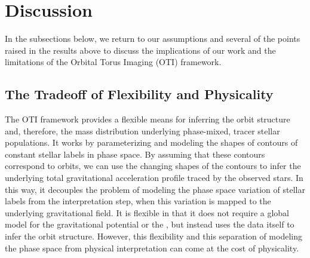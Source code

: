 \documentclass[modern]{aastex631}
\begin{document}


\section{Discussion} \label{sec:discussion}

In the subsections below, we return to our assumptions and several of the points raised
in the results above to discuss the implications of our work and the limitations of the
Orbital Torus Imaging (OTI) framework.

\subsection{The Tradeoff of Flexibility and Physicality} \label{sec:disc-tradeoff}

The OTI framework provides a flexible means for inferring the orbit structure and,
therefore, the mass distribution underlying phase-mixed, tracer stellar populations.
It works by parameterizing and modeling the shapes of contours of constant stellar
labels in phase space.
By assuming that these contours correspond to orbits, we can use the changing shapes of
the contours to infer the underlying total gravitational acceleration profile traced by
the observed stars.
In this way, it decouples the problem of modeling the phase space variation of stellar
labels from the interpretation step, when this variation is mapped to the underlying
gravitational field.
It is flexible in that it does not require a global model for the gravitational
potential or the \df, but instead uses the data itself to infer the orbit structure.
However, this flexibility and this separation of modeling the phase space from physical
interpretation can come at the cost of physicality.
\end{document}
